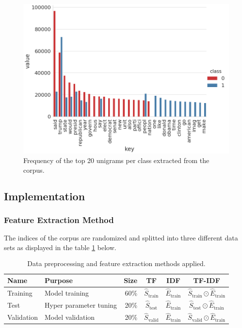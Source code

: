 \documentclass[a4paper,12pt,nottoc]{article}
\begin{document}
\begin{figure}[h]
\includegraphics[width=14cm]{output/word_analysis_1.png}
\centering
\caption{Frequency of the top 20 unigrams per class extracted from the corpus.}\label{fig:top20}
\end{figure}

\subsection{Implementation}

\subsubsection{Feature Extraction Method}

The indices of the corpus are randomized and splitted into three different data sets as displayed in the table \ref{tab:datapreproc} below.

\begin{table}[h]
\begin{center}
\begin{tabular}{| l | l | r | c | c | c |}
\hline
Name & Purpose & Size & TF & IDF & TF-IDF \\
\hline
Training & Model training & 60\% & $\hat{S}_{\textrm{train}}$ & $\hat{E}_{\textrm{train}}$ & $\hat{S}_{\textrm{train}} \odot \hat{E}_{\textrm{train}}$ \\  
Test & Hyper parameter tuning & 20\% & $\hat{S}_{\textrm{test}}$ & $\hat{E}_{\textrm{train}}$ & $\hat{S}_{\textrm{test}} \odot \hat{E}_{\textrm{train}}$ \\    
Validation & Model validation & 20\% & $\hat{S}_{\textrm{valid}}$ & $\hat{E}_{\textrm{train}}$ & $\hat{S}_{\textrm{valid}} \odot \hat{E}_{\textrm{train}}$ \\
\hline 
\end{tabular}
\end{center}
\caption{Data preprocessing and feature extraction methods applied.}\label{tab:datapreproc}
\end{table}
\end{document}
